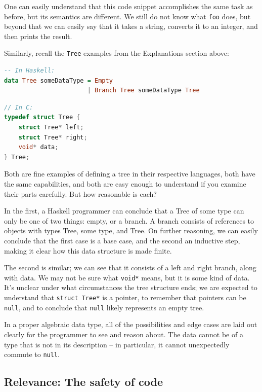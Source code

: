 \documentclass[12pt,a4paper]{article}
\begin{document}
		One can easily understand that this code snippet accomplishes the same task as before, but its semantics are different. We still do not know what \texttt{foo} does, but beyond that we can easily say that it takes a string, converts it to an integer, and then prints the result.
		
		Similarly, recall the \texttt{Tree} examples from the Explanations section above:
		\begin{lstlisting}[language=Haskell]
-- In Haskell:
data Tree someDataType = Empty
                       | Branch Tree someDataType Tree
		\end{lstlisting}
		\begin{lstlisting}[language=C]
// In C:
typedef struct Tree {
	struct Tree* left;
	struct Tree* right;
	void* data;
} Tree;
		\end{lstlisting}
		
		Both are fine examples of defining a tree in their respective languages, both have the same capabilities, and both are easy enough to understand if you examine their parts carefully. But how reasonable is each?
		
		In the first, a Haskell programmer can conclude that a Tree of some type can only be one of two things: empty, or a branch. A branch consists of references to objects with types Tree, some type, and Tree. On further reasoning, we can easily conclude that the first case is a base case, and the second an inductive step, making it clear how this data structure is made finite.
		
		The second is similar; we can see that it consists of a left and right branch, along with data. We may not be sure what \texttt{void*} means, but it is some kind of data. It's unclear under what circumstances the tree structure ends; we are expected to understand that \texttt{struct Tree*} is a pointer, to remember that pointers can be \texttt{null}, and to conclude that \texttt{null} likely represents an empty tree.
		
		In a proper algebraic data type, all of the possibilities and edge cases are laid out clearly for the programmer to see and reason about. The data cannot be of a type that is not in its description -- in particular, it cannot unexpectedly commute to \texttt{null}.
		
		\subsection{Relevance: The safety of code}
		
\end{document}
